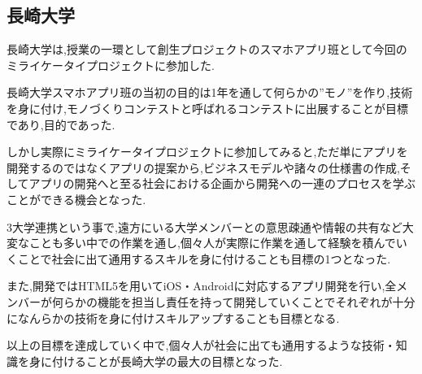 \subsection{長崎大学}
\par
長崎大学は,授業の一環として創生プロジェクトのスマホアプリ班として今回のミライケータイプロジェクトに参加した.
\par
長崎大学スマホアプリ班の当初の目的は1年を通して何らかの”モノ”を作り,技術を身に付け,モノづくりコンテストと呼ばれるコンテストに出展することが目標であり,目的であった.
\par
しかし実際にミライケータイプロジェクトに参加してみると,ただ単にアプリを開発するのではなくアプリの提案から,ビジネスモデルや諸々の仕様書の作成,そしてアプリの開発へと至る社会における企画から開発への一連のプロセスを学ぶことができる機会となった.
\par
3大学連携という事で,遠方にいる大学メンバーとの意思疎通や情報の共有など大変なことも多い中での作業を通し,個々人が実際に作業を通して経験を積んでいくことで社会に出て通用するスキルを身に付けることも目標の1つとなった.
\par
また,開発ではHTML5を用いてiOS・Androidに対応するアプリ開発を行い,全メンバーが何らかの機能を担当し責任を持って開発していくことでそれぞれが十分になんらかの技術を身に付けスキルアップすることも目標となる.
\par
以上の目標を達成していく中で,個々人が社会に出ても通用するような技術・知識を身に付けることが長崎大学の最大の目標となった.
\par
{}
